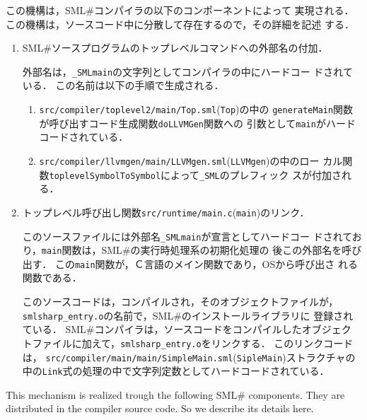 \documentclass{jbook}
\newif\ifjp
\newcommand{\smlsharp}{SML\#}
\newcommand{\code}[1]{\mbox{\large\tt #1}}
\newcommand{\module}[2]{\code{#1}(\code{#2})}
\begin{document}
\ifjp%
	この機構は，\smlsharp{}コンパイラの以下のコンポーネントによって
実現される．
	この機構は，ソースコード中に分散して存在するので，その詳細を記述
する．
\begin{enumerate}
\item \smlsharp{}ソースプログラムのトップレベルコマンドへの外部名の付加．

	外部名は，\code{\_SMLmain}の文字列としてコンパイラの中にハードコー
ドされている．
	この名前は以下の手順で生成される．
\begin{enumerate}
\item \module{src/compiler/toplevel2/main/Top.sml}{Top}の中の
\code{generateMain}関数が呼び出すコード生成関数\code{doLLVMGen}関数への
引数として\code{main}がハードコードされている．
\item \module{src/compiler/llvmgen/main/LLVMgen.sml}{LLVMgen}の中のロー
カル関数\code{toplevelSymbolToSymbol}によって\code{\_SML}のプレフィック
スが付加される．
\end{enumerate}

\item トップレベル呼び出し関数\module{src/runtime/main.c}{main}のリンク．

	このソースファイルには外部名\code{\_SMLmain}が宣言としてハードコー
ドされており，\code{main}関数は，\smlsharp{}の実行時処理系の初期化処理の
後この外部名を呼び出す．
	この\code{main}関数が，Ｃ言語のメイン関数であり，OSから呼び出さ
れる関数である．

	このソースコードは，コンパイルされ，そのオブジェクトファイルが，
\code{smlsharp\_entry.o}の名前で，\smlsharp{}のインストールライブラリに
登録されている．
	\smlsharp{}コンパイラは，ソースコードをコンパイルしたオブジェク
トファイルに加えて，\code{smlsharp\_entry.o}をリンクする．
	このリンクコードは，
\module{src/compiler/main/main/SimpleMain.sml}{SipleMain}ストラクチャの
中の\code{Link}式の処理の中で文字列定数としてハードコードされている．
\end{enumerate}
\else%
	This mechanism is realized trough the following \smlsharp{}
components.
	They are distributed in the compiler source code.
	So we describe its details here.
\end{document}
